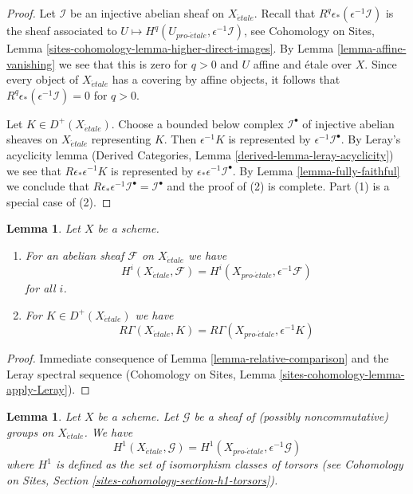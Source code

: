 \documentclass{stacks-project}
\theoremstyle{plain}
\newtheorem{lemma}[subsection]{Lemma}
\theoremstyle{definition}
\theoremstyle{remark}
\numberwithin{equation}{subsection}
\def\proetale{{pro\text{-}\acute{e}tale}}
\def\etale{{\acute{e}tale}}
\begin{document}
\begin{proof}
Let $\mathcal{I}$ be an injective abelian sheaf on $X_\etale$.
Recall that $R^q\epsilon_*(\epsilon^{-1}\mathcal{I})$ is the sheaf associated
to $U \mapsto H^q(U_\proetale, \epsilon^{-1}\mathcal{I})$, see
Cohomology on Sites, Lemma \ref{sites-cohomology-lemma-higher-direct-images}.
By Lemma \ref{lemma-affine-vanishing} we see that this is zero for $q > 0$
and $U$ affine and \'etale over $X$. Since every object of
$X_\etale$ has a covering by affine objects, it follows that
$R^q\epsilon_*(\epsilon^{-1}\mathcal{I}) = 0$ for $q > 0$.

\medskip\noindent
Let $K \in D^+(X_\etale)$. Choose a bounded below complex $\mathcal{I}^\bullet$
of injective abelian sheaves on $X_\etale$ representing $K$.
Then $\epsilon^{-1}K$ is represented by $\epsilon^{-1}\mathcal{I}^\bullet$.
By Leray's acyclicity lemma (Derived Categories, Lemma
\ref{derived-lemma-leray-acyclicity}) we see that $R\epsilon_*\epsilon^{-1}K$
is represented by $\epsilon_*\epsilon^{-1}\mathcal{I}^\bullet$.
By Lemma \ref{lemma-fully-faithful} we conclude that
$R\epsilon_*\epsilon^{-1}\mathcal{I}^\bullet = \mathcal{I}^\bullet$
and the proof of (2) is complete. Part (1) is a special case of (2).
\end{proof}

\begin{lemma}
\label{lemma-compare-cohomology}
Let $X$ be a scheme.
\begin{enumerate}
\item For an abelian sheaf $\mathcal{F}$ on $X_\etale$ we have
$$
H^i(X_\etale, \mathcal{F}) =
H^i(X_\proetale, \epsilon^{-1}\mathcal{F})
$$
for all $i$.
\item For $K \in D^+(X_\etale)$ we have
$$
R\Gamma(X_\etale, K) = R\Gamma(X_\proetale, \epsilon^{-1}K)
$$
\end{enumerate}
\end{lemma}

\begin{proof}
Immediate consequence of Lemma \ref{lemma-relative-comparison} and
the Leray spectral sequence (Cohomology on Sites, Lemma
\ref{sites-cohomology-lemma-apply-Leray}).
\end{proof}

\begin{lemma}
\label{lemma-compare-cohomology-nonabelian}
Let $X$ be a scheme. Let $\mathcal{G}$ be a sheaf of (possibly
noncommutative) groups on $X_\etale$. We have
$$
H^1(X_\etale, \mathcal{G}) =
H^1(X_\proetale, \epsilon^{-1}\mathcal{G})
$$
where $H^1$ is defined as the set of isomorphism classes of
torsors (see
Cohomology on Sites, Section \ref{sites-cohomology-section-h1-torsors}).
\end{lemma}
\end{document}
